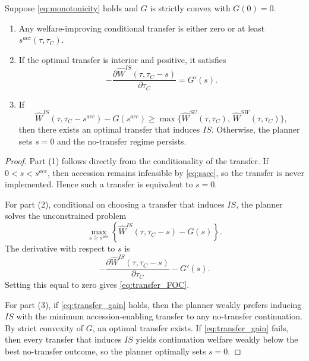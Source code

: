 \begin{proposition}
Suppose \eqref{eq:monotonicity} holds and $G$ is strictly convex with
$G(0)=0$.

\begin{enumerate}
    \item Any welfare-improving conditional transfer is either zero or at
    least $s^{acc}(\tau,\tau_C)$.

    \item If the optimal transfer is interior and positive, it satisfies
    \begin{equation}
    -\frac{\partial \widehat W^{IS}(\tau,\tau_C-s)}{\partial \tau_C}
    =
    G'(s).
    \label{eq:transfer_FOC}
    \end{equation}

    \item If
    \begin{equation}
    \widehat W^{IS}(\tau,\tau_C-s^{acc})-G(s^{acc})
    \ge
    \max\{\widehat W^{SU}(\tau,\tau_C),\,\widehat W^{SW}(\tau,\tau_C)\},
    \label{eq:transfer_gain}
    \end{equation}
    then there exists an optimal transfer that induces $IS$. Otherwise, the
    planner sets $s=0$ and the no-transfer regime persists.
\end{enumerate}
\label{prop:transfer}
\end{proposition}

\begin{proof}
Part (1) follows directly from the conditionality of the transfer. If
$0<s<s^{acc}$, then accession remains infeasible by \eqref{eq:sacc}, so the
transfer is never implemented. Hence such a transfer is equivalent to $s=0$.

For part (2), conditional on choosing a transfer that induces $IS$, the
planner solves the unconstrained problem
\[
\max_{s\ge s^{acc}}
\left\{
\widehat W^{IS}(\tau,\tau_C-s)-G(s)
\right\}.
\]
The derivative with respect to $s$ is
\[
-\frac{\partial \widehat W^{IS}(\tau,\tau_C-s)}{\partial \tau_C}-G'(s).
\]
Setting this equal to zero gives \eqref{eq:transfer_FOC}.

For part (3), if \eqref{eq:transfer_gain} holds, then the planner weakly
prefers inducing $IS$ with the minimum accession-enabling transfer to any
no-transfer continuation. By strict convexity of $G$, an optimal transfer
exists. If \eqref{eq:transfer_gain} fails, then every transfer that induces
$IS$ yields continuation welfare weakly below the best no-transfer outcome, so
the planner optimally sets $s=0$.
\end{proof}

